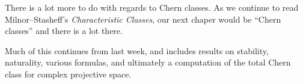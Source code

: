 \documentclass{homework}
\author{Jim Fowler}
\date{Week 11: Chern classes}
\begin{document}
\maketitle

There is a lot more to do with regards to Chern classes.  As we
continue to read Milnor--Stasheff's \textit{Characteristic Classes},
our next chaper would be ``Chern classes'' and there is a lot there.

Much of this continues from last week, and includes results on
stability, naturality, various formulas, and ultimately a computation
of the total Chern class for complex projective space.
\end{document}
